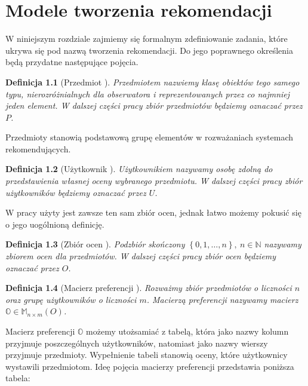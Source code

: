 \documentclass[12pt,a4paper]{report}
\newtheorem{df}{Definicja}[chapter]
\newcommand{\set}[1]{\left\lbrace {#1} \right\rbrace}
\newcommand{\setN}{\mathbb{N}}
\newcommand{\setUzytkownicy}{\mathit{U}}
\newcommand{\setPrzedmioty}{\mathit{P}}
\newcommand{\setOceny}{\mathit{O}}
\begin{document}
\chapter{Modele tworzenia rekomendacji}

W niniejszym rozdziale zajmiemy się formalnym zdefiniowanie zadania, które ukrywa się pod nazwą tworzenia rekomendacji. Do jego poprawnego określenia będą przydatne następujące pojęcia.

\begin{df}[Przedmiot {\citep[Sec 1.3]{kidzinski}}]
 Przedmiotem nazwiemy klasę obiektów tego samego typu, nierozróżnialnych dla obserwatora i reprezentowanych przez co najmniej jeden element. W dalszej części pracy zbiór przedmiotów będziemy oznaczać przez $\setPrzedmioty$.
\end{df}

Przedmioty stanowią podstawową grupę elementów w rozważaniach systemach rekomendujących. 

\begin{df}[Użytkownik {\citep[Sec 1.3]{kidzinski}}]
Użytkownikiem nazywamy osobę zdolną do przedstawienia własnej oceny wybranego przedmiotu. W dalszej części pracy zbiór użytkowników będziemy oznaczać przez $\setUzytkownicy$.
\end{df}

W pracy \citep{kidzinski} użyty jest zawsze ten sam zbiór ocen, jednak łatwo możemy pokusić się o jego uogólnioną definicję.

\begin{df}[Zbiór ocen {\citep[Sec 1.3]{kidzinski}}]
Podzbiór skończony $\set{0,1, \ldots, n}, \: n\in \setN$ nazywamy zbiorem ocen dla przedmiotów. W dalszej części pracy zbiór ocen będziemy oznaczać przez $\setOceny$.
\end{df} 

\begin{df}[Macierz preferencji {\citep[Sec 1.3]{kidzinski}}]
Rozważmy zbiór przedmiotów o liczności $n$ oraz grupę użytkowników o liczności $m$. Macierzą preferencji nazywamy macierz $\mathbb{O} \in \mathbb{M}_{n \times m}(\setOceny)$.
\end{df}

Macierz preferencji $\mathbb{O}$ możemy utożsamiać z tabelą, która jako nazwy kolumn przyjmuje poszczególnych użytkowników, natomiast jako nazwy wierszy przyjmuje przedmioty. Wypełnienie tabeli stanowią oceny, które użytkownicy wystawili przedmiotom. Ideę pojęcia macierzy preferencji przedstawia poniższa tabela:
\end{document}
